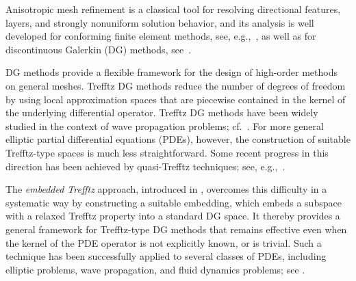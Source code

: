 \documentclass[a4paper,twoside,10pt]{article}
\numberwithin{equation}{section}
\begin{document}
		Anisotropic mesh refinement is a classical tool for resolving directional features, layers, and strongly nonuniform solution behavior,
        and its analysis is well developed
		for conforming finite element methods, see, e.g.,~\cite{apel99,AD92ai,AL96am,FP03ae},
        as well as for discontinuous Galerkin (DG) methods, see~\cite{G03dm,G06hp,GHH07hp,GHH09ap,GHH08ar}.
		
		DG methods provide a flexible framework for the design of high-order methods on general meshes.
		Trefftz DG methods 
		 reduce the number of degrees of freedom by using local approximation spaces that are piecewise contained in the kernel of the underlying differential operator.
		Trefftz DG methods have been widely studied in the context of wave propagation problems; cf.~\cite{CHP19ha,HMP14lr,HMP16sv,KSTW14dg}.
		For more general elliptic partial differential equations (PDEs), however, the construction of suitable Trefftz-type spaces is much less straightforward.
		Some recent progress in this direction has been achieved by quasi-Trefftz techniques; see, e.g.,~\cite{IMPS25qe,P23qd}.
		
		The \emph{embedded Trefftz} approach, introduced in \cite{LS_IJMNE_2023,lozinski19}, overcomes this difficulty in a systematic way by constructing a suitable embedding, which embeds a subspace with a relaxed Trefftz property into a standard DG space.
		It thereby provides a general framework for Trefftz-type DG methods that remains effective even when the kernel of the PDE operator is not explicitly known, or is trivial.
        Such a technique has been successfully applied to several classes of PDEs, including elliptic problems, wave propagation, and fluid dynamics problems; see \cite{GPS_JSC_2025,H24,HLSW23ut,LLS_NM_2024,LLSV_ARXIV_2024,LS_IJMNE_2023,S23,SV_ARXIV_2026}.
		
\end{document}
